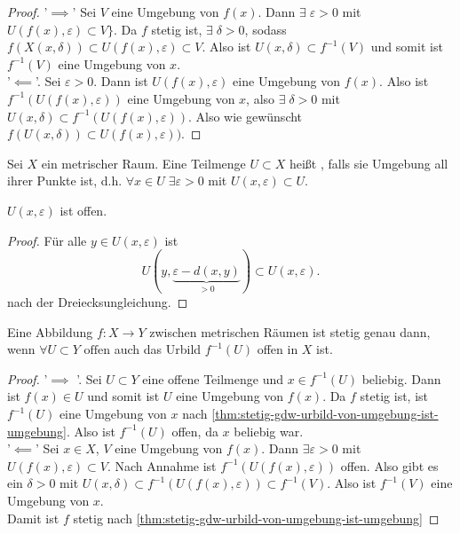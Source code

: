 \begin{proof}
'$\implies$' Sei $V$ eine Umgebung von  $f(x)$. Dann  $\exists \; ε>0$ mit $U(f(x),ε) \subset V\}$. Da $f$ stetig ist,  $\exists \; δ>0$, sodass $f(X(x,δ)) \subset U(f(x),ε)\subset V$. Also ist $U(x,δ)\subset f^{-1}(V)$ und somit ist $f^{-1}(V)$ eine Umgebung von $x$. \\
'$\impliedby$'.  Sei $ε>0$. Dann ist  $U(f(x),ε)$ eine Umgebung von  $f(x)$. Also ist  $f^{-1}(U(f(x),ε))$ eine Umgebung von $x$, also  $\exists \; δ>0$ mit $U(x,δ) \subset f^{-1}(U(f(x),ε))$. Also wie gewünscht $f(U(x,δ)) \subset U(f(x),ε))$.
\end{proof}

\begin{definition}\label{def:offene-menge-metrischer-raum} 
    Sei $X$ ein metrischer Raum. Eine Teilmenge  $U\subset X$ heißt , falls sie Umgebung all ihrer Punkte ist, d.h. $\forall x\in U \;\exists ε>0$ mit $U(x,ε)\subset U$.
\end{definition}
\begin{remark}
    $U(x,ε)$ ist offen.
\end{remark}
\begin{proof}
    Für alle $y\in U(x,ε)$ ist
    \[
        U(y, \underbrace{ε - d(x,y)}_{>0}) \subset U(x,ε)
    .\] 
    nach der Dreiecksungleichung.
\end{proof}

\begin{theorem}\label{thm:urbild-offener-menge-ist-offen}
    Eine Abbildung $f:X\to Y$ zwischen metrischen Räumen ist stetig genau dann, wenn $\forall U \subset Y \text{  offen}$ auch das Urbild $f^{-1}(U)$ offen in $X$ ist.
\end{theorem}
\begin{proof}
    '$\implies$ '. Sei $U\subset Y$ eine offene Teilmenge und $x\in f^{-1}(U)$ beliebig. Dann ist $f(x) \in U$ und somit ist $U$ eine Umgebung von  $f(x)$. Da  $f$ stetig ist, ist  $f^{-1}(U)$ eine Umgebung von $x$ nach \autoref{thm:stetig-gdw-urbild-von-umgebung-ist-umgebung}. Also ist $f^{-1}(U)$ offen, da $x$ beliebig war.\\
    '$\impliedby$' Sei $x\in X$, $V$ eine Umgebung von  $f(x)$. Dann  $\exists ε>0$ mit $U(f(x),ε)\subset V$. Nach Annahme ist $f^{-1}(U(f(x),ε))$ offen. Also gibt es ein $δ>0$ mit  $U(x,δ) \subset f^{-1}(U(f(x),ε))\subset f^{-1}(V)$. Also ist $f^{-1}(V)$ eine Umgebung von $x$. \\
    Damit ist  $f$ stetig nach \autoref{thm:stetig-gdw-urbild-von-umgebung-ist-umgebung}
\end{proof}

